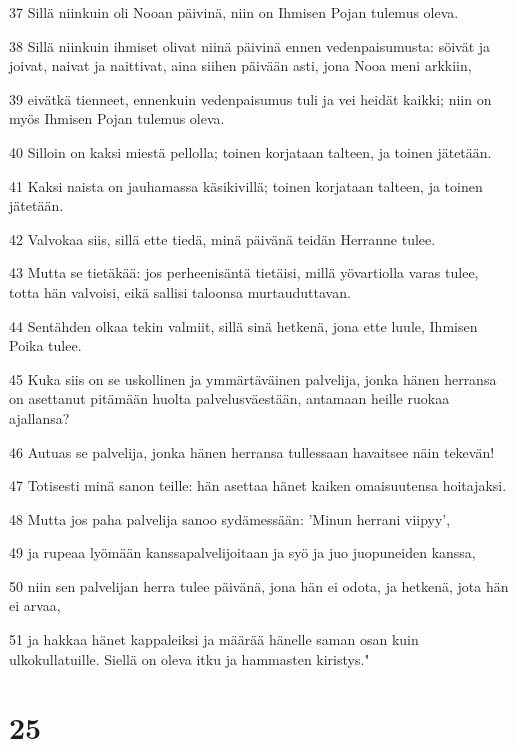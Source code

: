 \par 37 Sillä niinkuin oli Nooan päivinä, niin on Ihmisen Pojan tulemus oleva.
\par 38 Sillä niinkuin ihmiset olivat niinä päivinä ennen vedenpaisumusta: söivät ja joivat, naivat ja naittivat, aina siihen päivään asti, jona Nooa meni arkkiin,
\par 39 eivätkä tienneet, ennenkuin vedenpaisumus tuli ja vei heidät kaikki; niin on myös Ihmisen Pojan tulemus oleva.
\par 40 Silloin on kaksi miestä pellolla; toinen korjataan talteen, ja toinen jätetään.
\par 41 Kaksi naista on jauhamassa käsikivillä; toinen korjataan talteen, ja toinen jätetään.
\par 42 Valvokaa siis, sillä ette tiedä, minä päivänä teidän Herranne tulee.
\par 43 Mutta se tietäkää: jos perheenisäntä tietäisi, millä yövartiolla varas tulee, totta hän valvoisi, eikä sallisi taloonsa murtauduttavan.
\par 44 Sentähden olkaa tekin valmiit, sillä sinä hetkenä, jona ette luule, Ihmisen Poika tulee.
\par 45 Kuka siis on se uskollinen ja ymmärtäväinen palvelija, jonka hänen herransa on asettanut pitämään huolta palvelusväestään, antamaan heille ruokaa ajallansa?
\par 46 Autuas se palvelija, jonka hänen herransa tullessaan havaitsee näin tekevän!
\par 47 Totisesti minä sanon teille: hän asettaa hänet kaiken omaisuutensa hoitajaksi.
\par 48 Mutta jos paha palvelija sanoo sydämessään: 'Minun herrani viipyy',
\par 49 ja rupeaa lyömään kanssapalvelijoitaan ja syö ja juo juopuneiden kanssa,
\par 50 niin sen palvelijan herra tulee päivänä, jona hän ei odota, ja hetkenä, jota hän ei arvaa,
\par 51 ja hakkaa hänet kappaleiksi ja määrää hänelle saman osan kuin ulkokullatuille. Siellä on oleva itku ja hammasten kiristys."

\chapter{25}

